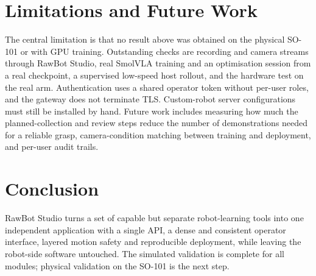 \documentclass[conference]{IEEEtran}
\begin{document}
\section{Limitations and Future Work}
The central limitation is that no result above was obtained on the physical SO-101 or with
GPU training. Outstanding checks are recording and camera streams through RawBot Studio, real
SmolVLA training and an optimisation session from a real checkpoint, a supervised low-speed
host rollout, and the hardware test on the real arm. Authentication uses a shared operator
token without per-user roles, and the gateway does not terminate TLS. Custom-robot server
configurations must still be installed by hand. Future work includes measuring how much the
planned-collection and review steps reduce the number of demonstrations needed for a reliable
grasp, camera-condition matching between training and deployment, and per-user audit trails.

\section{Conclusion}
RawBot Studio turns a set of capable but separate robot-learning tools into one independent
application with a single API, a dense and consistent operator interface, layered motion
safety and reproducible deployment, while leaving the robot-side software untouched. The
simulated validation is complete for all modules; physical validation on the SO-101 is the
next step.
\end{document}
